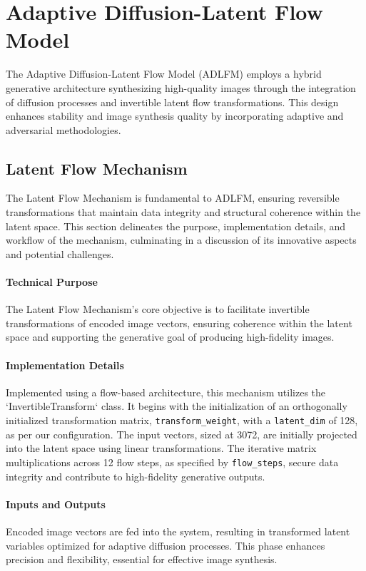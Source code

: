 \section{Adaptive Diffusion-Latent Flow Model}

The Adaptive Diffusion-Latent Flow Model (ADLFM) employs a hybrid generative architecture synthesizing high-quality images through the integration of diffusion processes and invertible latent flow transformations. This design enhances stability and image synthesis quality by incorporating adaptive and adversarial methodologies.

\subsection{Latent Flow Mechanism}

The Latent Flow Mechanism is fundamental to ADLFM, ensuring reversible transformations that maintain data integrity and structural coherence within the latent space. This section delineates the purpose, implementation details, and workflow of the mechanism, culminating in a discussion of its innovative aspects and potential challenges.

\paragraph{Technical Purpose}
The Latent Flow Mechanism's core objective is to facilitate invertible transformations of encoded image vectors, ensuring coherence within the latent space and supporting the generative goal of producing high-fidelity images.

\paragraph{Implementation Details}
Implemented using a flow-based architecture, this mechanism utilizes the `InvertibleTransform` class. It begins with the initialization of an orthogonally initialized transformation matrix, \texttt{transform\_weight}, with a \texttt{latent\_dim} of 128, as per our configuration. The input vectors, sized at 3072, are initially projected into the latent space using linear transformations. The iterative matrix multiplications across 12 flow steps, as specified by \texttt{flow\_steps}, secure data integrity and contribute to high-fidelity generative outputs.

\paragraph{Inputs and Outputs}
Encoded image vectors are fed into the system, resulting in transformed latent variables optimized for adaptive diffusion processes. This phase enhances precision and flexibility, essential for effective image synthesis.

